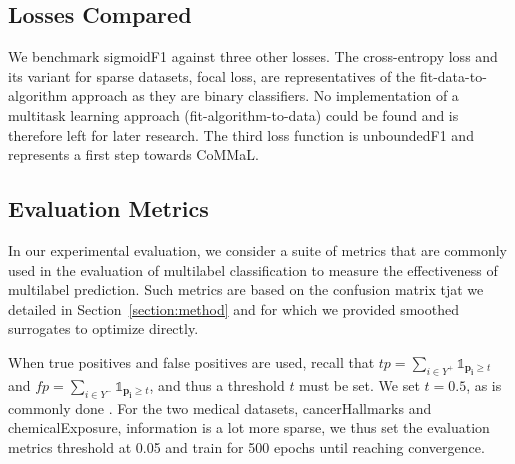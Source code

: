 \subsection{Losses Compared}
\label{section:losssescompared}

We benchmark sigmoidF1 against three other losses. The cross-entropy loss and its variant for sparse datasets, focal loss, are representatives of the fit-data-to-algorithm approach as they are binary classifiers. No implementation of a multitask learning approach (fit-algorithm-to-data) could be found and is therefore left for later research. The third loss function is unboundedF1 and represents a first step towards CoMMaL.

 
\subsection{Evaluation Metrics}
\label{sec:evalMetrics}

In our experimental evaluation, we consider a suite of metrics that are commonly used in the evaluation of multilabel classification to measure the effectiveness of multilabel prediction. Such metrics are based on the confusion matrix tjat we detailed in Section~\ref{section:method} and for which we provided smoothed surrogates to optimize directly.

When true positives and false positives are used, recall that \(t p=\sum_{i \in Y^{+}} \mathds{1}_{\mathbf{p_i} \geq t}\) and \(f p=\sum_{i \in Y^{-}} \mathds{1}_{\mathbf{p_i} \geq t}\), and thus a threshold \(t\) must be set. We set \(t = 0.5\), as is commonly done .
For the two medical datasets, cancerHallmarks and chemicalExposure, information is a lot more sparse, we thus set the evaluation metrics threshold at 0.05 and train for 500 epochs until reaching convergence. 

